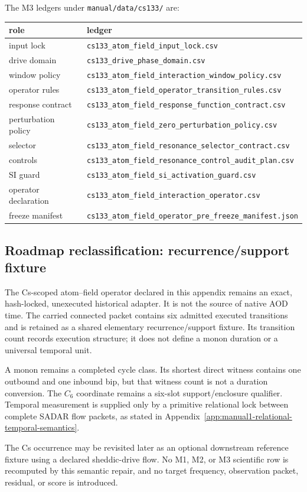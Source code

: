 The M3 ledgers under \texttt{manual/data/cs133/} are:
\begin{center}
\begin{tabular}{@{}ll@{}}
\toprule
role & ledger\\
\midrule
input lock & \texttt{cs133\_atom\_field\_input\_lock.csv}\\
drive domain & \texttt{cs133\_drive\_phase\_domain.csv}\\
window policy & \texttt{cs133\_atom\_field\_interaction\_window\_policy.csv}\\
operator rules & \texttt{cs133\_atom\_field\_operator\_transition\_rules.csv}\\
response contract & \texttt{cs133\_atom\_field\_response\_function\_contract.csv}\\
perturbation policy & \texttt{cs133\_atom\_field\_zero\_perturbation\_policy.csv}\\
selector & \texttt{cs133\_atom\_field\_resonance\_selector\_contract.csv}\\
controls & \texttt{cs133\_atom\_field\_resonance\_control\_audit\_plan.csv}\\
SI guard & \texttt{cs133\_atom\_field\_si\_activation\_guard.csv}\\
operator declaration & \texttt{cs133\_atom\_field\_interaction\_operator.csv}\\
freeze manifest & \texttt{cs133\_atom\_field\_operator\_pre\_freeze\_manifest.json}\\
\bottomrule
\end{tabular}
\end{center}

\subsection{Roadmap reclassification: recurrence/support fixture}

The Cs-scoped atom--field operator declared in this appendix remains an exact,
hash-locked, unexecuted historical adapter.  It is not the source of native
AOD time.  The carried connected packet contains six admitted executed
transitions and is retained as a shared elementary recurrence/support fixture.
Its transition count records execution structure; it does not define a monon
duration or a universal temporal unit.

A monon remains a completed cycle class.  Its shortest direct witness contains
one outbound and one inbound bip, but that witness count is not a duration
conversion.  The \(C_6\) coordinate remains a six-slot support/enclosure
qualifier.  Temporal measurement is supplied only by a primitive relational
lock between complete SADAR flow packets, as stated in
Appendix~\ref{app:manual1-relational-temporal-semantics}.

The Cs occurrence may be revisited later as an optional downstream reference
fixture using a declared sheddic-drive flow.  No M1, M2, or M3 scientific row
is recomputed by this semantic repair, and no target frequency, observation
packet, residual, or score is introduced.
